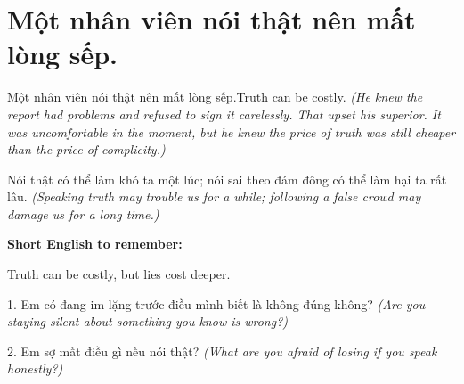 \section{Một nhân viên nói thật nên mất lòng sếp.}
\begin{truyen}{Một nhân viên nói thật nên mất lòng sếp.}{Truth can be costly.}
\textit{(He knew the report had problems and refused to sign it carelessly. That upset his superior. It was uncomfortable in the moment, but he knew the price of truth was still cheaper than the price of complicity.)}
\end{truyen}
\begin{baihoc}
Nói thật có thể làm khó ta một lúc; nói sai theo đám đông có thể làm hại ta rất lâu.
\textit{(Speaking truth may trouble us for a while; following a false crowd may damage us for a long time.)}
\end{baihoc}
\begin{ghinhoanh}\textbf{Short English to remember:}

Truth can be costly, but lies cost deeper.
\end{ghinhoanh}
\begin{tuhocnhanh}
1. Em có đang im lặng trước điều mình biết là không đúng không? \textit{(Are you staying silent about something you know is wrong?)}

2. Em sợ mất điều gì nếu nói thật? \textit{(What are you afraid of losing if you speak honestly?)}
\end{tuhocnhanh}
\ngancach

